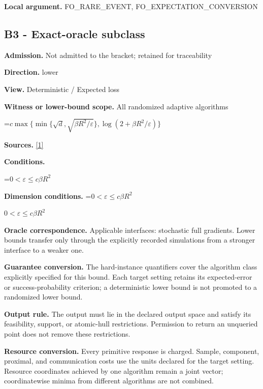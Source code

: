 \documentclass[10pt,a4paper]{article}
\newcommand{\AtlasMath}[1]{\par\begingroup\centering\setbox0=\hbox{$\displaystyle #1$}\ifdim\wd0>1.4\linewidth\typeout{ATLAS WIDE FORMULA: \the\wd0}\fi\ifdim\wd0>\linewidth\resizebox{\linewidth}{!}{\box0}\else\box0\fi\par\endgroup}
\newcommand{\AtlasInlineMath}[1]{\begingroup\setbox0=\hbox{$#1$}\ifdim\wd0>.4\linewidth\endgroup\AtlasMath{#1}\else\endgroup$#1$\fi}
\begin{document}
\textbf{Local argument.} FO\_RARE\_EVENT, FO\_EXPECTATION\_CONVERSION



\subsection{B3 - Exact-oracle subclass}


\textbf{Admission.} Not admitted to the bracket; retained for traceability



\textbf{Direction.} lower



\textbf{View.} Deterministic / Expected loss



\textbf{Witness or lower-bound scope.} All randomized adaptive algorithms



\AtlasMath{c\max\{\min\{\sqrt d,\sqrt{\beta R^2/\varepsilon}\},\log(2+\beta R^2/\varepsilon)\}}


\textbf{Sources.} \href{https://arxiv.org/pdf/2609.10874}{[1]}



\textbf{Conditions.}
\AtlasMath{0<\varepsilon\le c\beta R^2}




\textbf{Dimension conditions.} \AtlasInlineMath{0<\varepsilon\le c\beta R^2}



\textbf{Oracle correspondence.} Applicable interfaces: stochastic full gradients. Lower bounds transfer only through the explicitly recorded simulations from a stronger interface to a weaker one.



\textbf{Guarantee conversion.} The hard-instance quantifiers cover the algorithm class explicitly specified for this bound. Each target setting retains its expected-error or success-probability criterion; a deterministic lower bound is not promoted to a randomized lower bound.



\textbf{Output rule.} The output must lie in the declared output space and satisfy its feasibility, support, or atomic-hull restrictions. Permission to return an unqueried point does not remove these restrictions.



\textbf{Resource conversion.} Every primitive response is charged. Sample, component, proximal, and communication costs use the units declared for the target setting. Resource coordinates achieved by one algorithm remain a joint vector; coordinatewise minima from different algorithms are not combined.
\end{document}
